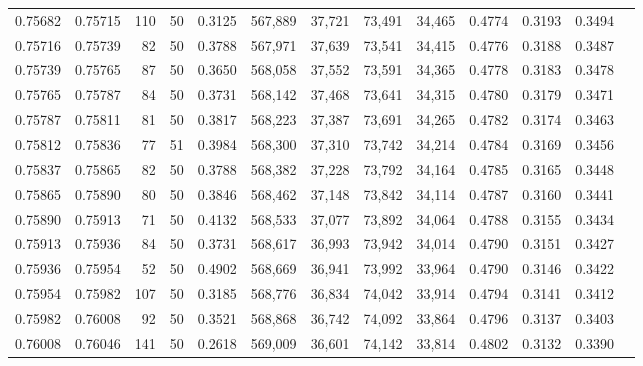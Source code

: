 \begin{tabular}{rrrrrrrrrrrrr}
0.75682 & 0.75715 &   110 &  50 &                                     0.3125 & 567,889 &  37,721 &  73,491 &  34,465 & 0.4774 & 0.3193 & 0.3494 \\
0.75716 & 0.75739 &    82 &  50 &                                     0.3788 & 567,971 &  37,639 &  73,541 &  34,415 & 0.4776 & 0.3188 & 0.3487 \\
0.75739 & 0.75765 &    87 &  50 &                                     0.3650 & 568,058 &  37,552 &  73,591 &  34,365 & 0.4778 & 0.3183 & 0.3478 \\
0.75765 & 0.75787 &    84 &  50 &                                     0.3731 & 568,142 &  37,468 &  73,641 &  34,315 & 0.4780 & 0.3179 & 0.3471 \\
0.75787 & 0.75811 &    81 &  50 &                                     0.3817 & 568,223 &  37,387 &  73,691 &  34,265 & 0.4782 & 0.3174 & 0.3463 \\
0.75812 & 0.75836 &    77 &  51 &                                     0.3984 & 568,300 &  37,310 &  73,742 &  34,214 & 0.4784 & 0.3169 & 0.3456 \\
0.75837 & 0.75865 &    82 &  50 &                                     0.3788 & 568,382 &  37,228 &  73,792 &  34,164 & 0.4785 & 0.3165 & 0.3448 \\
0.75865 & 0.75890 &    80 &  50 &                                     0.3846 & 568,462 &  37,148 &  73,842 &  34,114 & 0.4787 & 0.3160 & 0.3441 \\
0.75890 & 0.75913 &    71 &  50 &                                     0.4132 & 568,533 &  37,077 &  73,892 &  34,064 & 0.4788 & 0.3155 & 0.3434 \\
0.75913 & 0.75936 &    84 &  50 &                                     0.3731 & 568,617 &  36,993 &  73,942 &  34,014 & 0.4790 & 0.3151 & 0.3427 \\
0.75936 & 0.75954 &    52 &  50 &                                     0.4902 & 568,669 &  36,941 &  73,992 &  33,964 & 0.4790 & 0.3146 & 0.3422 \\
0.75954 & 0.75982 &   107 &  50 &                                     0.3185 & 568,776 &  36,834 &  74,042 &  33,914 & 0.4794 & 0.3141 & 0.3412 \\
0.75982 & 0.76008 &    92 &  50 &                                     0.3521 & 568,868 &  36,742 &  74,092 &  33,864 & 0.4796 & 0.3137 & 0.3403 \\
0.76008 & 0.76046 &   141 &  50 &                                     0.2618 & 569,009 &  36,601 &  74,142 &  33,814 & 0.4802 & 0.3132 & 0.3390 \\

\end{tabular}
